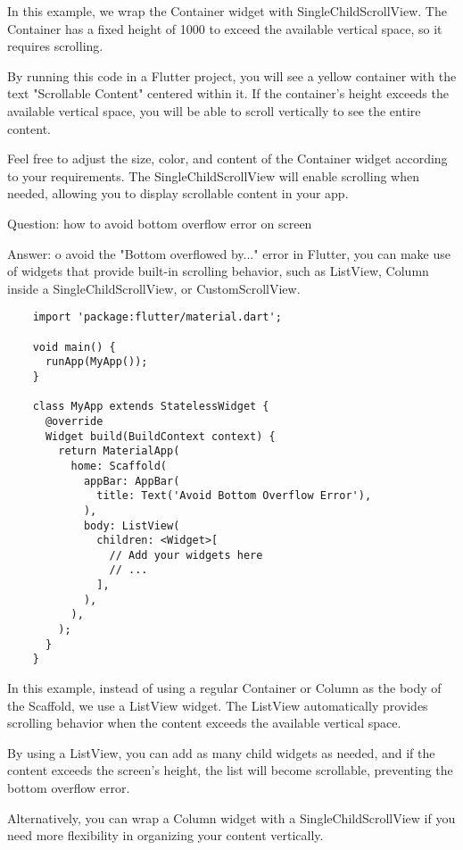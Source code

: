 In this example, we wrap the Container widget with SingleChildScrollView. The Container has a fixed height of 1000 to 
exceed the available vertical space, so it requires scrolling.

By running this code in a Flutter project, you will see a yellow container with the text "Scrollable Content" 
centered within it. If the container's height exceeds the available vertical space, you will be able to scroll 
vertically to see the entire content.

Feel free to adjust the size, color, and content of the Container widget according to your requirements. The 
SingleChildScrollView will enable scrolling when needed, allowing you to display scrollable content in your app.

Question: how to avoid bottom overflow error on screen

Answer: o avoid the "Bottom overflowed by..." error in Flutter, you can make use of widgets that provide built-in 
scrolling behavior, such as ListView, Column inside a SingleChildScrollView, or CustomScrollView.

\begin{lstlisting}
    import 'package:flutter/material.dart';

    void main() {
      runApp(MyApp());
    }
    
    class MyApp extends StatelessWidget {
      @override
      Widget build(BuildContext context) {
        return MaterialApp(
          home: Scaffold(
            appBar: AppBar(
              title: Text('Avoid Bottom Overflow Error'),
            ),
            body: ListView(
              children: <Widget>[
                // Add your widgets here
                // ...
              ],
            ),
          ),
        );
      }
    }    
\end{lstlisting}

In this example, instead of using a regular Container or Column as the body of the Scaffold, we use a ListView widget. 
The ListView automatically provides scrolling behavior when the content exceeds the available vertical space.

By using a ListView, you can add as many child widgets as needed, and if the content exceeds the screen's height, 
the list will become scrollable, preventing the bottom overflow error.

Alternatively, you can wrap a Column widget with a SingleChildScrollView if you need more flexibility in organizing 
your content vertically.

